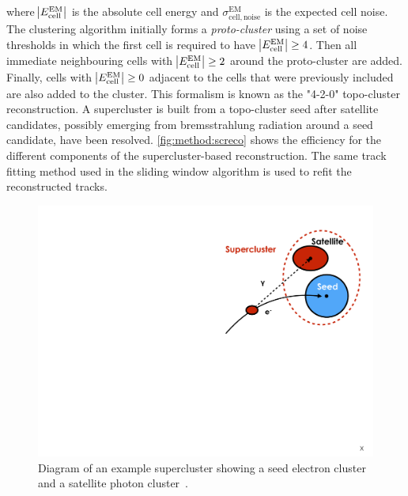 where $\abs{E^{\mathrm{EM}}_{\mathrm{cell}}}$ is the absolute cell energy and $\sigma^{\mathrm{EM}}_{\mathrm{cell,noise}}$ is the expected cell noise. The clustering algorithm initially forms a \emph{proto-cluster} using a set of noise thresholds in which the first cell is required to have $\abs{E^{\mathrm{EM}}_{\mathrm{cell}}} \geq 4$. Then all immediate neighbouring cells with $\abs{E^{\mathrm{EM}}_{\mathrm{cell}}} \geq 2$ around the proto-cluster are added. Finally, cells with $\abs{E^{\mathrm{EM}}_{\mathrm{cell}}} \geq 0$ adjacent to the cells that were previously included are also added to the cluster. This formalism is known as the "4-2-0" topo-cluster reconstruction. A supercluster is built from a topo-cluster seed after satellite candidates, possibly emerging from bremsstrahlung radiation around a seed candidate, have been resolved. \cref{fig:method:screco} shows the efficiency for the different components of the supercluster-based reconstruction. The same track fitting method used in the sliding window algorithm is used to refit the reconstructed tracks.
\begin{figure}[h]
    \centering
    \includegraphics[width=\mediumfigwidth]{images/topo-cluster.pdf}
    \caption[Diagram of an example supercluster showing a seed electron cluster and a satellite photon cluster.]{Diagram of an example supercluster showing a seed electron cluster and a satellite photon cluster~\cite{ATL-PHYS-PUB-2017-022}.}
    \label{fig:method:superclusterscheme}
\end{figure}
